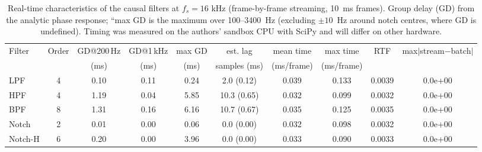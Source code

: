 \begin{table}[!t]
\caption{Real-time characteristics of the causal filters at $f_s=16$ kHz (frame-by-frame streaming, 10~ms frames). Group delay (GD) from the analytic phase response; ``max GD is the maximum over 100--3400~Hz (excluding $\pm10$~Hz around notch centres, where GD is undefined). Timing was measured on the authors' sandbox CPU with SciPy and will differ on other hardware.}
\label{tab:rt}
\centering\footnotesize
\begin{tabular}{lccccccccc}
\hline
Filter & Order & GD@200\,Hz & GD@1\,kHz & max GD & est. lag & mean time & max time & RTF & max$|$stream$-$batch$|$ \\
 & & (ms) & (ms) & (ms) & samples (ms) & (ms/frame) & (ms/frame) & & \\ \hline
LPF & 4 & 0.10 & 0.11 & 0.24 & 2.0 (0.12) & 0.039 & 0.133 & 0.0039 & 0.0e+00 \\
HPF & 4 & 1.19 & 0.04 & 5.85 & 10.3 (0.65) & 0.032 & 0.099 & 0.0032 & 0.0e+00 \\
BPF & 8 & 1.31 & 0.16 & 6.16 & 10.7 (0.67) & 0.035 & 0.125 & 0.0035 & 0.0e+00 \\
Notch & 2 & 0.01 & 0.00 & 0.06 & 0.0 (0.00) & 0.032 & 0.098 & 0.0032 & 0.0e+00 \\
Notch-H & 6 & 0.20 & 0.00 & 3.96 & 0.0 (0.00) & 0.033 & 0.090 & 0.0033 & 0.0e+00 \\
\hline
\end{tabular}
\end{table}